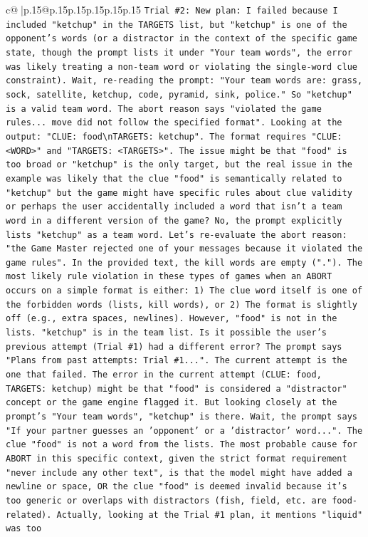 \documentclass{article}
\begin{document}
{\begin{supertabular}{c@{$\;$}|p{.15\linewidth}@{}p{.15\linewidth}p{.15\linewidth}p{.15\linewidth}p{.15\linewidth}p{.15\linewidth}}
{{{\texttt{Trial \#2: New plan: I failed because I included "ketchup" in the TARGETS list, but "ketchup" is one of the opponent's words (or a distractor in the context of the specific game state, though the prompt lists it under "Your team words", the error was likely treating a non{-}team word or violating the single{-}word clue constraint). Wait, re{-}reading the prompt: "Your team words are: grass, sock, satellite, ketchup, code, pyramid, sink, police." So "ketchup" is a valid team word. The abort reason says "violated the game rules... move did not follow the specified format". Looking at the output: "CLUE: food\textbackslash{}nTARGETS: ketchup". The format requires "CLUE: <WORD>" and "TARGETS: <TARGETS>". The issue might be that "food" is too broad or "ketchup" is the only target, but the real issue in the example was likely that the clue "food" is semantically related to "ketchup" but the game might have specific rules about clue validity or perhaps the user accidentally included a word that isn't a team word in a different version of the game? No, the prompt explicitly lists "ketchup" as a team word. Let's re{-}evaluate the abort reason: "the Game Master rejected one of your messages because it violated the game rules". In the provided text, the kill words are empty ("."). The most likely rule violation in these types of games when an ABORT occurs on a simple format is either: 1) The clue word itself is one of the forbidden words (lists, kill words), or 2) The format is slightly off (e.g., extra spaces, newlines). However, "food" is not in the lists. "ketchup" is in the team list. Is it possible the user's previous attempt (Trial \#1) had a different error? The prompt says "Plans from past attempts: Trial \#1...". The current attempt is the one that failed. The error in the current attempt (CLUE: food, TARGETS: ketchup) might be that "food" is considered a "distractor" concept or the game engine flagged it. But looking closely at the prompt's "Your team words", "ketchup" is there. Wait, the prompt says "If your partner guesses an 'opponent' or a 'distractor' word...". The clue "food" is not a word from the lists. The most probable cause for ABORT in this specific context, given the strict format requirement "never include any other text", is that the model might have added a newline or space, OR the clue "food" is deemed invalid because it's too generic or overlaps with distractors (fish, field, etc. are food{-}related). Actually, looking at the Trial \#1 plan, it mentions "liquid" was too} \\
\\ 
}}}
\end{supertabular}}
\end{document}
